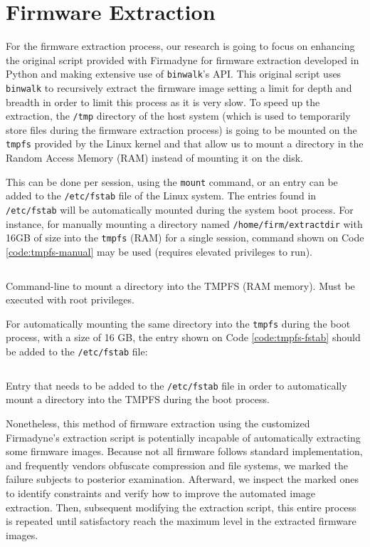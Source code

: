 \section{Firmware Extraction}
\label{sec:extraction}

For the firmware extraction process, our research is going to focus on enhancing the original script provided with Firmadyne \cite{firmadyne} for firmware extraction developed in Python and making extensive use of {\tt binwalk}'s API. This original script uses {\tt binwalk} to recursively extract the firmware image setting a limit for depth and breadth in order to limit this process as it is very slow. To speed up the extraction, the {\tt /tmp} directory of the host system (which is used to temporarily store files during the firmware extraction process) is going to be mounted on the {\tt tmpfs} provided by the Linux kernel and that allow us to mount a directory in the Random Access Memory (RAM) instead of mounting it on the disk.

This can be done per session, using the {\tt mount} command, or an entry can be added to the {\tt /etc/fstab} file of the Linux system. The entries found in {\tt /etc/fstab} will be automatically mounted during the system boot process. For instance, for manually mounting a directory named {\tt /home/firm/extractdir} with 16GB of size into the {\tt tmpfs} (RAM) for a single session, command shown on Code \ref{code:tmpfs-manual} may be used (requires elevated privileges to run).

\begin{listing}[H]
\inputminted[breaklines]{text}{Code/tmpfs-mount}
\caption{Command-line to mount a directory into the TMPFS (RAM memory). Must be executed with root privileges.}
\label{code:tmpfs-manual}
\end{listing}

For automatically mounting the same directory into the {\tt tmpfs} during the boot process, with a size of 16 GB, the entry shown on Code \ref{code:tmpfs-fstab} should be added to the {\tt /etc/fstab} file:

\begin{listing}[H]
\inputminted[breaklines]{text}{Code/tmpfs-fstab}
\caption{Entry that needs to be added to the {\tt /etc/fstab} file in order to automatically mount a directory into the TMPFS during the boot process.}
\label{code:tmpfs-fstab}
\end{listing}

Nonetheless, this method of firmware extraction using the customized Firmadyne's \cite{firmadyne} extraction script is potentially incapable of automatically extracting some firmware images. Because not all firmware follows standard implementation, and frequently vendors obfuscate compression and file systems, we marked the failure subjects to posterior examination. Afterward, we inspect the marked ones to identify constraints and verify how to improve the automated image extraction. Then, subsequent modifying the extraction script, this entire process is repeated until satisfactory reach the maximum level in the extracted firmware images.

